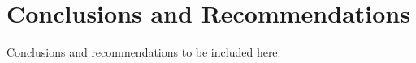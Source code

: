 \chapter{Conclusions and Recommendations} \label{cha:conclusion}

Conclusions and recommendations to be included here.
